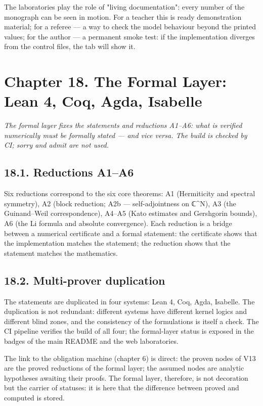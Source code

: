 \documentclass[11pt,a4paper]{article}
\begin{document}
The laboratories play the role of "living documentation": every number of the monograph can be seen in motion. For a teacher this is ready demonstration material; for a referee — a way to check the model behaviour beyond the printed values; for the author — a permanent smoke test: if the implementation diverges from the control files, the tab will show it.

\section{Chapter 18. The Formal Layer: Lean 4, Coq, Agda, Isabelle}

\noindent\textit{\color{copper}The formal layer fixes the statements and reductions A1–A6: what is verified numerically must be formally stated — and vice versa. The build is checked by CI; sorry and admit are not used.}

\subsection{18.1. Reductions A1–A6}

Six reductions correspond to the six core theorems: A1 (Hermiticity and spectral symmetry), A2 (block reduction; A2b — self-adjointness on ℂ\textasciicircum{}N), A3 (the Guinand–Weil correspondence), A4–A5 (Kato estimates and Gershgorin bounds), A6 (the Li formula and absolute convergence). Each reduction is a bridge between a numerical certificate and a formal statement: the certificate shows that the implementation matches the statement; the reduction shows that the statement matches the mathematics.

\subsection{18.2. Multi-prover duplication}

The statements are duplicated in four systems: Lean 4, Coq, Agda, Isabelle. The duplication is not redundant: different systems have different kernel logics and different blind zones, and the consistency of the formulations is itself a check. The CI pipeline verifies the build of all four; the formal-layer status is exposed in the badges of the main README and the web laboratories.

The link to the obligation machine (chapter 6) is direct: the proven nodes of V13 are the proved reductions of the formal layer; the assumed nodes are analytic hypotheses awaiting their proofs. The formal layer, therefore, is not decoration but the carrier of statuses: it is here that the difference between proved and computed is stored.
\end{document}
